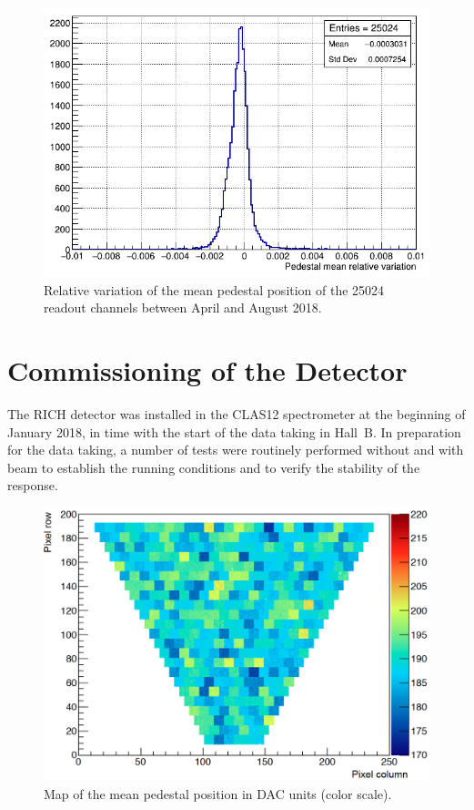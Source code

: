 \documentclass[5p,times,twocolumn]{elsarticle}
\begin{document}
\begin{figure}[t]
\begin{center}
\includegraphics[width=1.0\columnwidth]{PedestalMeanVariation.png}
\end{center}
\caption{Relative variation of the mean pedestal position of the 25024 readout channels between April and August
  2018.}
\label{fig:PedestalMean}
\end{figure}

\section{Commissioning of the Detector}
\label{sec:Commissioning}

The RICH detector was installed in the CLAS12 spectrometer at the beginning of January 2018, in time with the start
of the data taking in Hall~B. In preparation for the data taking, a number of tests were routinely performed without
and with beam to establish the running conditions and to verify the stability of the response.


\begin{figure}[t]
\begin{center}
\includegraphics[width=1.0\columnwidth]{Pedestal_map.png}
\end{center}
\caption{Map of the mean pedestal position in DAC units (color scale).}
\label{fig:PedestalMap}
\end{figure}
\end{document}
